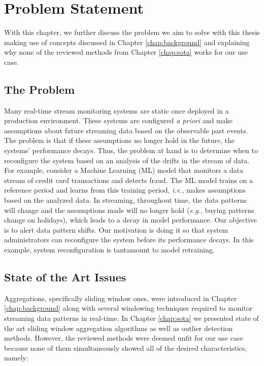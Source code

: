 \chapter{Problem Statement} \label{chap:statement} \minitoc

With this chapter, we further discuss the problem we aim to solve with this thesis making use of concepts discussed in Chapter \ref{chap:background} and explaining why none of the reviewed methods from Chapter \ref{chap:sota} works for our use case.

\section{The Problem} \label{sec:theproblem}
Many real-time stream monitoring systems are static once deployed in a production environment. These systems are configured \textit{a priori} and make assumptions about future streaming data based on the observable past events. The problem is that if these assumptions no longer hold in the future, the systems' performance decays. Thus, the problem at hand is to determine when to reconfigure the system based on an analysis of the drifts in the stream of data. For example, consider a Machine Learning (ML) model that monitors a data stream of credit card transactions and detects fraud. The ML model trains on a reference period and learns from this training period, \textit{i.e.}, makes assumptions based on the analyzed data. In streaming, throughout time, the data patterns will change and the assumptions made will no longer hold (\textit{e.g.}, buying patterns change on holidays), which leads to a decay in model performance. Our objective is to alert data pattern shifts. Our motivation is doing it so that system administrators can reconfigure the system before its performance decays. In this example, system reconfiguration is tantamount to model retraining.

\section{State of the Art Issues} \label{sec:sotaissues}
Aggregations, specifically sliding window ones, were introduced in Chapter \ref{chap:background} along with several windowing techniques required to monitor streaming data patterns in real-time. In Chapter \ref{chap:sota} we presented state of the art sliding window aggregation algorithms as well as outlier detection methods. However, the reviewed methods were deemed unfit for our use case because none of them simultaneously showed all of the desired characteristics, namely:

